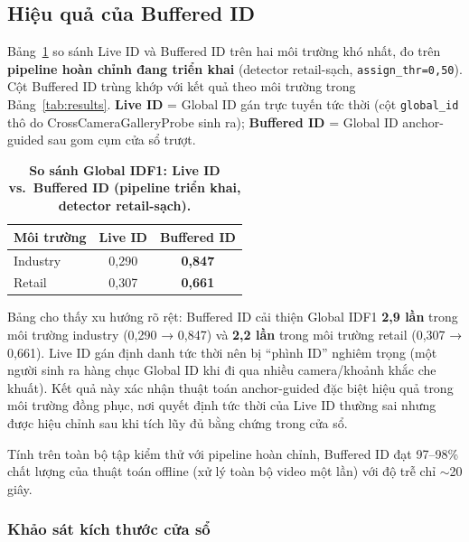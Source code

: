 \documentclass{article} %
\begin{document}
\subsection{Hiệu quả của Buffered ID}
\label{sec:buffered_eval}

Bảng~\ref{tab:buffered} so sánh Live ID và Buffered ID trên hai môi trường khó nhất, đo trên \textbf{pipeline hoàn chỉnh đang triển khai} (detector retail-sạch, \texttt{assign\_thr=0,50}). Cột Buffered ID trùng khớp với kết quả theo môi trường trong Bảng~\ref{tab:results}. \textbf{Live ID} = Global ID gán trực tuyến tức thời (cột \texttt{global\_id} thô do CrossCameraGalleryProbe sinh ra); \textbf{Buffered ID} = Global ID anchor-guided sau gom cụm cửa sổ trượt.

\begin{table}[H]
    \centering
    \caption[So sánh Live ID và Buffered ID]{\bfseries\fontsize{12pt}{0pt}\selectfont So sánh Global IDF1: Live ID vs.\ Buffered ID (pipeline triển khai, detector retail-sạch).}
    \begin{tabular}{|l|c|c|}
    \hline
    \bfseries Môi trường & \bfseries Live ID & \bfseries Buffered ID \\
    \hline
    Industry & 0,290 & \textbf{0,847} \\
    Retail   & 0,307 & \textbf{0,661} \\
    \hline
    \end{tabular}
    \label{tab:buffered}
\end{table}

Bảng cho thấy xu hướng rõ rệt: Buffered ID cải thiện Global IDF1 \textbf{2,9 lần} trong môi trường industry (0,290 → 0,847) và \textbf{2,2 lần} trong môi trường retail (0,307 → 0,661). Live ID gán định danh tức thời nên bị ``phình ID'' nghiêm trọng (một người sinh ra hàng chục Global ID khi đi qua nhiều camera/khoảnh khắc che khuất). Kết quả này xác nhận thuật toán anchor-guided \cite{Huang2023} đặc biệt hiệu quả trong môi trường đồng phục, nơi quyết định tức thời của Live ID thường sai nhưng được hiệu chỉnh sau khi tích lũy đủ bằng chứng trong cửa sổ.

Tính trên toàn bộ tập kiểm thử với pipeline hoàn chỉnh, Buffered ID đạt 97--98\% chất lượng của thuật toán offline (xử lý toàn bộ video một lần) với độ trễ chỉ $\sim$20 giây.

\subsubsection{Khảo sát kích thước cửa sổ}
\label{sec:window_ablation}
\end{document}
